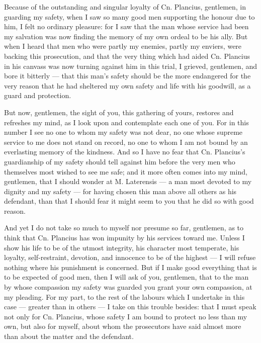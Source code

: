 
 Because of the outstanding and singular loyalty of Cn. Plancius, gentlemen, in guarding my safety, when I saw so many good men supporting the honour due to him, I felt no ordinary pleasure: for I saw that the man whose service had been my salvation was now finding the memory of my own ordeal to be his ally. But when I heard that men who were partly my enemies, partly my enviers, were backing this prosecution, and that the very thing which had aided Cn. Plancius in his canvass was now turning against him in this trial, I grieved, gentlemen, and bore it bitterly --- that this man's safety should be the more endangered for the very reason that he had sheltered my own safety and life with his goodwill, as a guard and protection.

 But now, gentlemen, the sight of you, this gathering of yours, restores and refreshes my mind, as I look upon and contemplate each one of you. For in this number I see no one to whom my safety was not dear, no one whose supreme service to me does not stand on record, no one to whom I am not bound by an everlasting memory of the kindness. And so I have no fear that Cn. Plancius's guardianship of my safety should tell against him before the very men who themselves most wished to see me safe; and it more often comes into my mind, gentlemen, that I should wonder at M. Laterensis --- a man most devoted to my dignity and my safety --- for having chosen this man above all others as his defendant, than that I should fear it might seem to you that he did so with good reason.

 And yet I do not take so much to myself nor presume so far, gentlemen, as to think that Cn. Plancius has won impunity by his services toward me. Unless I show his life to be of the utmost integrity, his character most temperate, his loyalty, self-restraint, devotion, and innocence to be of the highest --- I will refuse nothing where his punishment is concerned. But if I make good everything that is to be expected of good men, then I will ask of you, gentlemen, that to the man by whose compassion my safety was guarded you grant your own compassion, at my pleading. For my part, to the rest of the labours which I undertake in this case --- greater than in others --- I take on this trouble besides: that I must speak not only for Cn. Plancius, whose safety I am bound to protect no less than my own, but also for myself, about whom the prosecutors have said almost more than about the matter and the defendant.


